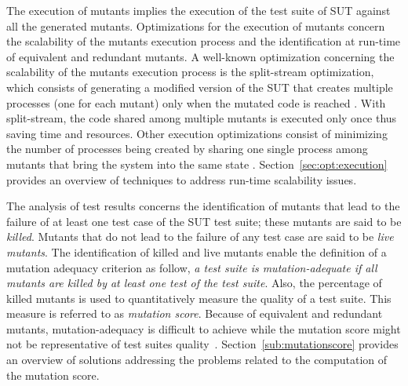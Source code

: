 The execution of mutants implies the execution of the test suite of SUT against all the generated mutants. 
Optimizations for the execution of mutants concern the scalability of the mutants execution process and 
the identification at run-time of equivalent and redundant mutants.
A well-known optimization concerning the scalability of the mutants execution process is the split-stream optimization, which consists of generating a modified version of the SUT that creates multiple processes (one for each mutant) only when the mutated code is reached \cite{tokumoto2016muvm}. With split-stream, the code shared among multiple mutants is executed only once thus saving time and resources. Other execution optimizations consist of minimizing the number of processes being created by sharing one single process among mutants that bring the system into the same state \cite{wang2017faster}.
Section~\ref{sec:opt:execution} provides an overview of techniques to address run-time scalability issues.



The analysis of test results concerns the identification of mutants that lead to the failure of at least one test case of the SUT test suite; these mutants are said to be \emph{killed}. Mutants that do not lead to the failure of any test case are said to be \emph{live mutants}. The identification of killed and live mutants enable the definition of a mutation adequacy criterion as follow, \emph{a test suite is mutation-adequate if all mutants are killed by at least one test of the test suite}. 
Also, the percentage of killed mutants is used to quantitatively measure the quality of a test suite. This measure is referred to as \emph{mutation score}.
Because of equivalent and redundant mutants, mutation-adequacy is difficult to achieve while the mutation score might not be representative of test suites quality~\cite{Papadakis:2016}. Section~\ref{sub:mutationscore} provides an overview of solutions addressing the problems related to the computation of the mutation score.



